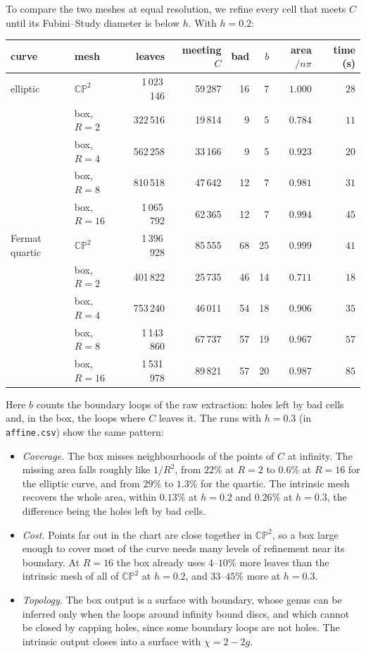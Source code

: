 \documentclass[11pt]{article}
\theoremstyle{plain}
\theoremstyle{definition}
\theoremstyle{remark}
\newcommand{\CP}{\mathbb{CP}}
\begin{document}
To compare the two meshes at equal resolution, we refine every cell that
meets $C$ until its Fubini--Study diameter is below $h$. With $h=0.2$:
\begin{center}
\small
\begin{tabular}{@{}llrrrrrr@{}}
\toprule
curve & mesh & leaves & meeting $C$ & bad & $b$ & area$/n\pi$ & time (s) \\
\midrule
elliptic & $\CP^2$ & 1\,023\,146 & 59\,287 & 16 & 7 & $1.000$ & $28$ \\
 & box, $R=2$ & 322\,516 & 19\,814 & 9 & 5 & $0.784$ & $11$ \\
 & box, $R=4$ & 562\,258 & 33\,166 & 9 & 5 & $0.923$ & $20$ \\
 & box, $R=8$ & 810\,518 & 47\,642 & 12 & 7 & $0.981$ & $31$ \\
 & box, $R=16$ & 1\,065\,792 & 62\,365 & 12 & 7 & $0.994$ & $45$ \\
\midrule
Fermat quartic & $\CP^2$ & 1\,396\,928 & 85\,555 & 68 & 25 & $0.999$ & $41$ \\
 & box, $R=2$ & 401\,822 & 25\,735 & 46 & 14 & $0.711$ & $18$ \\
 & box, $R=4$ & 753\,240 & 46\,011 & 54 & 18 & $0.906$ & $35$ \\
 & box, $R=8$ & 1\,143\,860 & 67\,737 & 57 & 19 & $0.967$ & $57$ \\
 & box, $R=16$ & 1\,531\,978 & 89\,821 & 57 & 20 & $0.987$ & $85$ \\
\bottomrule
\end{tabular}
\end{center}
Here $b$ counts the boundary loops of the raw extraction: holes left by
bad cells and, in the box, the loops where $C$ leaves it. The runs with
$h=0.3$ (in \texttt{affine.csv}) show the same pattern:
\begin{itemize}[itemsep=1pt]
\item \emph{Coverage.} The box misses neighbourhoods of the points of $C$
  at infinity. The missing area falls roughly like $1/R^2$, from $22\%$ at
  $R=2$ to $0.6\%$ at $R=16$ for the elliptic curve, and from $29\%$ to
  $1.3\%$ for the quartic. The intrinsic mesh recovers the whole area,
  within $0.13\%$ at $h=0.2$ and $0.26\%$ at $h=0.3$, the difference being
  the holes left by bad cells.
\item \emph{Cost.} Points far out in the chart are close together in
  $\CP^2$, so a box large enough to cover most of the curve needs many
  levels of refinement near its boundary. At $R=16$ the box already uses
  $4$--$10\%$ more leaves than the intrinsic mesh of all of $\CP^2$ at
  $h=0.2$, and $33$--$45\%$ more at $h=0.3$.
\item \emph{Topology.} The box output is a surface with boundary, whose
  genus can be inferred only when the loops around infinity bound discs,
  and which cannot be closed by capping holes, since some boundary loops
  are not holes. The intrinsic output closes into a surface with
  $\chi=2-2g$.
\end{itemize}
\end{document}
